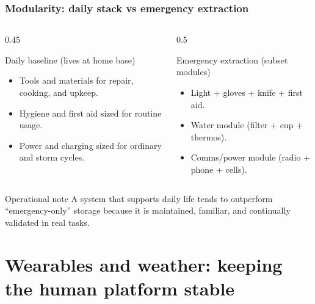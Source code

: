 \begin{frame}[t]
  \frametitle{Modularity: daily stack vs emergency extraction}
  \justifying
  \begin{columns}[T,totalwidth=\textwidth]
    \begin{column}{0.45\textwidth}
      \begin{block}{Daily baseline (lives at home base)}
        \begin{itemize}
          \item Tools and materials for repair, cooking, and upkeep.
          \item Hygiene and first aid sized for routine usage.
          \item Power and charging sized for ordinary and storm cycles.
        \end{itemize}
      \end{block}
    \end{column}
    \begin{column}{0.5\textwidth}
      \begin{block}{Emergency extraction (subset modules)}
        \begin{itemize}
          \item Light + gloves + knife + first aid.
          \item Water module (filter + cup + thermos).
          \item Comms/power module (radio + phone + cells).
        \end{itemize}
      \end{block}
    \end{column}
  \end{columns}

  \vspace{0.6em}
  \begin{block}{Operational note}
    A system that supports daily life tends to outperform ``emergency-only'' storage because it is maintained, familiar, and continually validated in real tasks.
  \end{block}
\end{frame}

\section{Wearables and weather: keeping the human platform stable}

